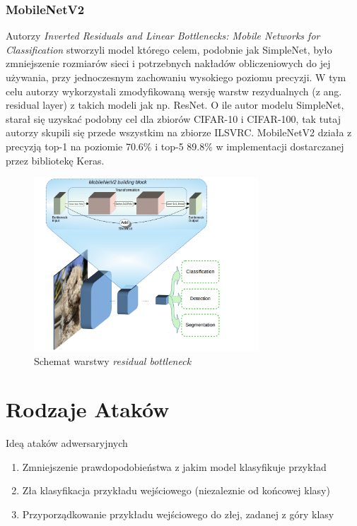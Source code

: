 \documentclass[
    left=2.5cm,         %
    right=2.5cm,        %
    top=2.5cm,          %
    bottom=3cm,         %
    bindingoffset=6mm,  %
    nohyphenation=false %
]{eiti/eiti-thesis}
\begin{document}
        \subsubsection{MobileNetV2}
            Autorzy \textit{Inverted Residuals and Linear Bottlenecks: Mobile Networks for Classification}\cite{DBLP:journals/corr/abs-1801-04381}
            stworzyli model którego celem, podobnie jak SimpleNet, było zmniejszenie rozmiarów sieci i potrzebnych nakładów obliczeniowych
            do jej używania, przy jednoczesnym zachowaniu wysokiego poziomu precyzji. W tym celu autorzy wykorzystali
            zmodyfikowaną wersję warstw rezydualnych (z ang. residual layer) z takich modeli jak np. ResNet\cite{DBLP:journals/corr/HeZR016}.
            O ile autor modelu SimpleNet, starał się uzyskać
            podobny cel dla zbiorów CIFAR-10 i CIFAR-100, tak tutaj autorzy skupili się przede wszystkim na zbiorze ILSVRC.
            MobileNetV2 działa z precyzją top-1 na poziomie 70.6\% i top-5 89.8\% w implementacji dostarczanej przez bibliotekę Keras.
            \begin{figure}[H]
            \begin{center}
            \includegraphics[width=0.75\textwidth]{eiti/mobilenetv2_overview.png}
            \caption{Schemat warstwy \textit{residual bottleneck}}
            \end{center}
            \end{figure}





\section{Rodzaje Ataków}
Ideą ataków adwersaryjnych
\begin{enumerate}
    \item Zmniejszenie prawdopodobieństwa z jakim model klasyfikuje przykład
    \item Zła klasyfikacja przykładu wejściowego (niezaleznie od końcowej klasy)
    \item Przyporządkowanie przykładu wejściowego do złej, zadanej z góry klasy
\end{enumerate}
\end{document}
